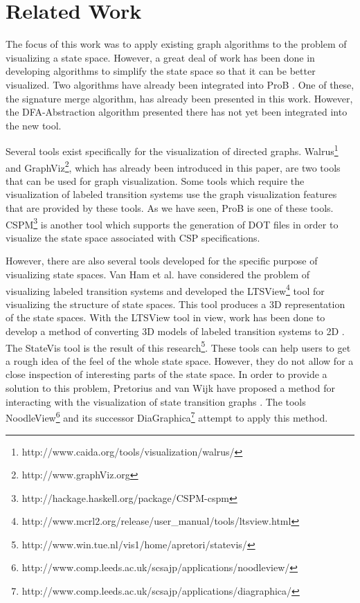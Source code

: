 \section{Related Work}

The focus of this work was to apply existing graph algorithms to the problem of visualizing a state space. However, a great deal of work has been done in developing algorithms to simplify the state space so that it can be better visualized. Two algorithms have already been integrated into ProB \cite{LeTu05_8}. One of these, the signature merge algorithm, has already been presented in this work. However, the DFA-Abstraction algorithm presented there has not yet been integrated into the new tool.

Several tools exist specifically for the visualization of directed graphs. Walrus\footnote{http://www.caida.org/tools/visualization/walrus/} and GraphViz\footnote{http://www.graphViz.org}, which has already been introduced in this paper, are two tools that can be used for graph visualization. Some tools which require the visualization of labeled transition systems use the graph visualization features that are provided by these tools. As we have seen, ProB is one of these tools. CSPM\footnote{http://hackage.haskell.org/package/CSPM-cspm} is another tool which supports the generation of DOT files in order to visualize the state space associated with CSP specifications.

However, there are also several tools developed for the specific purpose of visualizing state spaces. Van Ham et al. \cite{Ham02} have considered the problem of visualizing labeled transition systems and developed the LTSView\footnote{http://www.mcrl2.org/release/user\_manual/tools/ltsview.html} tool for visualizing the structure of state spaces. This tool produces a 3D representation of the state spaces. With the LTSView tool in view, work has been done to develop a method of converting 3D models of labeled transition systems to 2D \cite{Pretorius2005}. The StateVis tool is the result of this research\footnote{http://www.win.tue.nl/vis1/home/apretori/statevis/}. These tools can help users to get a rough idea of the feel of the whole state space. However, they do not allow for a close inspection of interesting parts of the state space. In order to provide a solution to this problem, Pretorius and van Wijk have proposed a method for interacting with the visualization of state transition graphs \cite{Pretorius2006}. The tools NoodleView\footnote{http://www.comp.leeds.ac.uk/scsajp/applications/noodleview/} and its successor DiaGraphica\footnote{http://www.comp.leeds.ac.uk/scsajp/applications/diagraphica/} attempt to apply this method.
